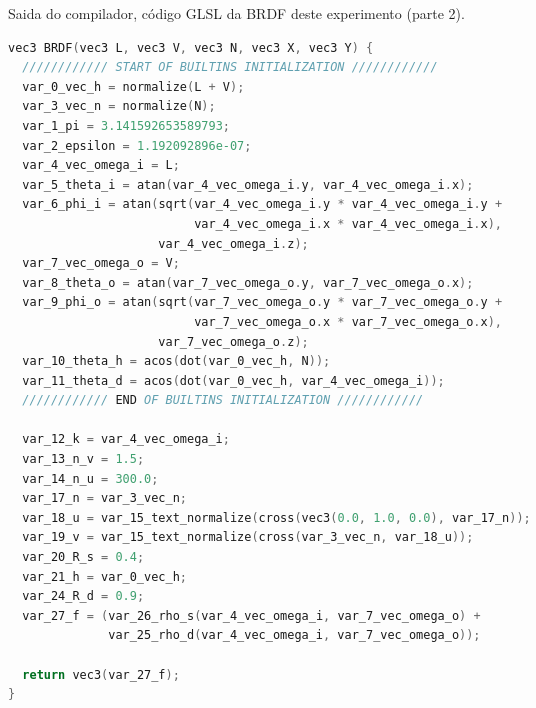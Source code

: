\begin{codigo}[H]
    \caption{\small Saida do compilador, código GLSL da BRDF deste experimento  (parte 2). }
    \label{cod-ashikhmin-shirley-close-to-original-eqlang}
\begin{lstlisting}[language=C, inputencoding=utf8]
vec3 BRDF(vec3 L, vec3 V, vec3 N, vec3 X, vec3 Y) {
  //////////// START OF BUILTINS INITIALIZATION ////////////
  var_0_vec_h = normalize(L + V);
  var_3_vec_n = normalize(N);
  var_1_pi = 3.141592653589793;
  var_2_epsilon = 1.192092896e-07;
  var_4_vec_omega_i = L;
  var_5_theta_i = atan(var_4_vec_omega_i.y, var_4_vec_omega_i.x);
  var_6_phi_i = atan(sqrt(var_4_vec_omega_i.y * var_4_vec_omega_i.y +
                          var_4_vec_omega_i.x * var_4_vec_omega_i.x),
                     var_4_vec_omega_i.z);
  var_7_vec_omega_o = V;
  var_8_theta_o = atan(var_7_vec_omega_o.y, var_7_vec_omega_o.x);
  var_9_phi_o = atan(sqrt(var_7_vec_omega_o.y * var_7_vec_omega_o.y +
                          var_7_vec_omega_o.x * var_7_vec_omega_o.x),
                     var_7_vec_omega_o.z);
  var_10_theta_h = acos(dot(var_0_vec_h, N));
  var_11_theta_d = acos(dot(var_0_vec_h, var_4_vec_omega_i));
  //////////// END OF BUILTINS INITIALIZATION ////////////

  var_12_k = var_4_vec_omega_i;
  var_13_n_v = 1.5;
  var_14_n_u = 300.0;
  var_17_n = var_3_vec_n;
  var_18_u = var_15_text_normalize(cross(vec3(0.0, 1.0, 0.0), var_17_n));
  var_19_v = var_15_text_normalize(cross(var_3_vec_n, var_18_u));
  var_20_R_s = 0.4;
  var_21_h = var_0_vec_h;
  var_24_R_d = 0.9;
  var_27_f = (var_26_rho_s(var_4_vec_omega_i, var_7_vec_omega_o) +
              var_25_rho_d(var_4_vec_omega_i, var_7_vec_omega_o));

  return vec3(var_27_f);
}
\end{lstlisting}
\end{codigo}

